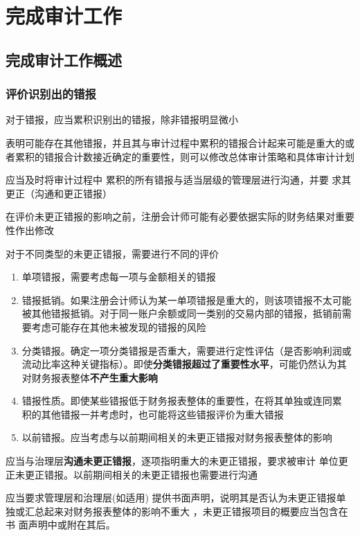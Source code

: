 \documentclass[UTF8,12pt]{ctexart}
\numberwithin{equation}{section} %
\numberwithin{figure}{section}
\numberwithin{table}{section}
\begin{document}
	\newpage
	\section{完成审计工作}
	
	\subsection{完成审计工作概述}
	\subsubsection{评价识别出的错报}
	对于错报，应当累积识别出的错报，除非错报明显微小
	
	表明可能存在其他错报，并且其与审计过程中累积的错报合计起来可能是重大的或者累积的错报合计数接近确定的重要性，则可以修改总体审计策略和具体审计计划
	
	应当及时将审计过程中  累积的所有错报与适当层级的管理层进行沟通，并要 求其更正（沟通和更正错报）
	
	在评价未更正错报的影响之前，注册会计师可能有必要依据实际的财务结果对重要性作出修改
	
	对于不同类型的未更正错报，需要进行不同的评价
	\begin{enumerate}
		\item 单项错报，需要考虑每一项与金额相关的错报
		
		\item 错报抵销。如果注册会计师认为某一单项错报是重大的，则该项错报不太可能被其他错报抵销。对于同一账户余额或同一类别的交易内部的错报，抵销前需要考虑可能存在其他未被发现的错报的风险
		
		\item 分类错报。确定一项分类错报是否重大，需要进行定性评估（是否影响利润或流动比率这种关键指标）。即使\textbf{分类错报超过了重要性水平}，可能仍然认为其对财务报表整体\textbf{不产生重大影响}
		
		\item 错报性质。即使某些错报低于财务报表整体的重要性，在将其单独或连同累 积的其他错报一并考虑时，也可能将这些错报评价为重大错报
		
		\item 以前错报。应当考虑与以前期间相关的未更正错报对财务报表整体的影响
	\end{enumerate}
	
	应当与治理层\textbf{沟通未更正错报}，逐项指明重大的未更正错报，要求被审计 单位更正未更正错报。以前期间相关的未更正错报也需要进行沟通
	
	应当要求管理层和治理层(如适用)  提供书面声明，说明其是否认为未更正错报单独或汇总起来对财务报表整体的影响不重大  ，未更正错报项目的概要应当包含在书 面声明中或附在其后。
	
\end{document}
